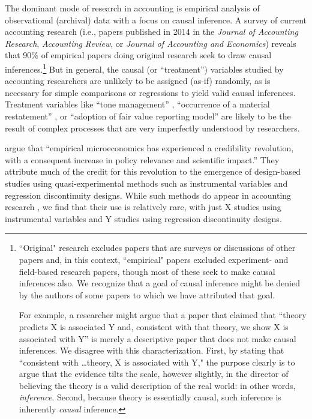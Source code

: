 The dominant mode of research in accounting is empirical analysis of observational (archival) data with a focus on causal inference. A survey of current accounting research (i.e., papers published in 2014 in the \textit{Journal of Accounting Research}, \textit{Accounting Review}, or \textit{Journal of Accounting and Economics}) reveals that 90\% of empirical papers doing original research seek to draw causal inferences.\footnote{``Original" research excludes papers that are surveys or discussions of other papers and, in this context, ``empirical" papers excluded experiment- and field-based research papers, though most of these seek to make causal inferences also. 
We recognize that a goal of causal inference might be denied by the authors of some papers to which we have attributed that goal.

For example, a researcher might argue that a paper that claimed that ``theory predicts X is associated Y and, consistent with that theory, we show X is associated with Y'' is merely a descriptive paper that does not make causal inferences. 
We disagree with this characterization. 
First, by stating that ``consistent with \dots theory, X is associated with Y," the purpose clearly is to argue that the evidence tilts the scale, however slightly, in the director of believing the theory is a valid description of the real world: in other words, \emph{inference}. 
Second, because theory is essentially causal, such inference is inherently \emph{causal} inference.} 
But in general, the causal (or ``treatment'') variables studied by accounting researchers are unlikely to be assigned (as-if) randomly, as is necessary for simple comparisons or regressions to yield valid causal inferences. Treatment variables like ``tone management'' \citep{Huang:2014cs}, ``occurrence of a material restatement'' \citep{Chen:2014ji}, or ``adoption of fair value reporting model'' \citep{Liang:2014ea} are likely to be the result of complex processes that are very imperfectly understood by researchers.

\cite{Angrist:2010jv} argue that ``empirical microeconomics has experienced a credibility revolution, with a consequent increase in policy relevance and scientific impact.''
They attribute much of the credit for this revolution to the emergence of design-based studies using quasi-experimental methods such as instrumental variables and regression discontinuity designs.
While such methods do appear in accounting research \citep{Larcker:2010fq}, we find that their use is relatively rare, with just X studies using instrumental variables and Y studies using regression discontinuity designs.

